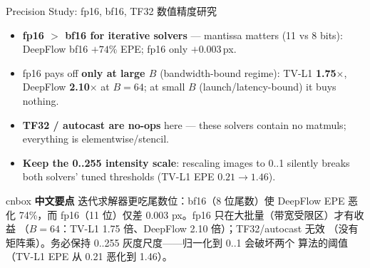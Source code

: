 \documentclass[aspectratio=169,10pt]{beamer}
\newcommand{\zh}[1]{{\zhfont #1}}
\newenvironment{cn}{%
  \begin{beamercolorbox}[rounded=true,sep=4pt,wd=\textwidth]{cnbox}\zhfont\footnotesize
  {\color{cblue!70!black}\textbf{中文要点}}\quad}%
  {\end{beamercolorbox}}
\begin{document}
\begin{frame}{Precision Study: fp16, bf16, TF32 \zh{数值精度研究}}
  \begin{itemize}\itemsep2pt
    \item \textbf{fp16 $>$ bf16 for iterative solvers} --- mantissa matters
      (11 vs 8 bits): DeepFlow bf16 $+74\%$ EPE; fp16 only $+0.003$\,px.
    \item fp16 pays off \textbf{only at large $B$} (bandwidth-bound regime):
      TV-L1 \textbf{1.75$\times$}, DeepFlow \textbf{2.10$\times$} at $B{=}64$;
      at small $B$ (launch/latency-bound) it buys nothing.
    \item \textbf{TF32 / autocast are no-ops} here --- these solvers contain
      no matmuls; everything is elementwise/stencil.
    \item \textbf{Keep the 0..255 intensity scale}: rescaling images to 0..1
      silently breaks both solvers' tuned thresholds
      (TV-L1 EPE $0.21 \to 1.46$).
  \end{itemize}
  \vfill
  \begin{cn}
    迭代求解器更吃尾数位：bf16（8 位尾数）使 DeepFlow EPE 恶化 74\%，而
    fp16（11 位）仅差 0.003 px。fp16 只在大批量（带宽受限区）才有收益
    （$B{=}64$：TV-L1 1.75 倍、DeepFlow 2.10 倍）；TF32/autocast 无效
    （没有矩阵乘）。务必保持 0..255 灰度尺度——归一化到 0..1 会破坏两个
    算法的阈值（TV-L1 EPE 从 0.21 恶化到 1.46）。
  \end{cn}
\end{frame}
\end{document}
